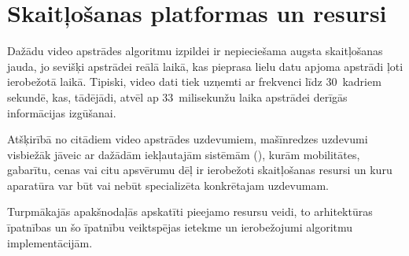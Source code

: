 \section{Skaitļošanas platformas un resursi} \label{sec:proc}
Dažādu video apstrādes algoritmu izpildei ir nepieciešama
augsta skaitļošanas jauda, jo sevišķi apstrādei reālā laikā, kas pieprasa
lielu datu apjoma apstrādi ļoti ierobežotā laikā. Tipiski, video dati
tiek uzņemti ar frekvenci līdz 30~kadriem sekundē, kas, tādējādi, atvēl ap
33~milisekunžu laika apstrādei derīgās informācijas izgūšanai.

Atšķirībā no citādiem video apstrādes uzdevumiem, mašīnredzes uzdevumi 
visbiežāk jāveic ar dažādām iekļautajām sistēmām (),
kurām mobilitātes, gabarītu, cenas vai citu apsvērumu dēļ ir ierobežoti
skaitļošanas resursi un kuru aparatūra var būt vai nebūt specializēta
konkrētajam uzdevumam.

Turpmākajās apakšnodaļās apskatīti pieejamo resursu veidi, to arhitektūras
īpatnības un šo īpatnību veiktspējas ietekme un ierobežojumi
algoritmu implementācijām.



